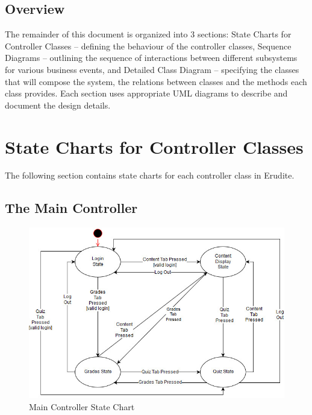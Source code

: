 \documentclass[]{article}
\begin{document}
\subsection{Overview}
\label{sub:overview}
The remainder of this document is organized into 3 sections: State Charts for
Controller Classes -- defining the behaviour of the controller classes,
Sequence Diagrams -- outlining the sequence of interactions between different
subsystems for various business events, and Detailed Class Diagram --
specifying the classes that will compose the system, the relations between
classes and the methods each class provides. Each section uses appropriate UML
diagrams to describe and document the design details.


\section{State Charts for Controller Classes}
\label{sec:state_charts_for_controller_classes}
The following section contains state charts for each controller class in Erudite.

\subsection{The Main Controller}
{
\begin{figure}[H]
  \centering
  \includegraphics[scale=0.5]{A3_Assets/MainController.jpg}
  \caption{Main Controller State Chart}
\end{figure}
}
\end{document}

